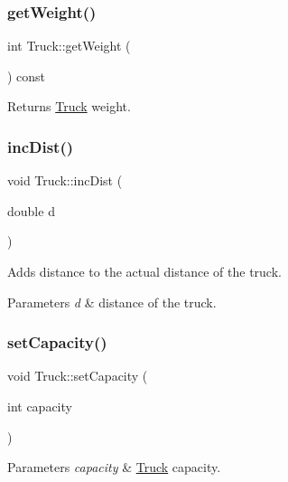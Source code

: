 \subsubsection{\texorpdfstring{get\+Weight()}{getWeight()}}
{\footnotesize\ttfamily int Truck\+::get\+Weight (\begin{DoxyParamCaption}{ }\end{DoxyParamCaption}) const}

\begin{DoxyReturn}{Returns}
\hyperlink{class_truck}{Truck} weight. 
\end{DoxyReturn}
\mbox{\label{class_truck_a42d199a149bb144de2da8163c8340c6c}} 
\subsubsection{\texorpdfstring{inc\+Dist()}{incDist()}}
{\footnotesize\ttfamily void Truck\+::inc\+Dist (\begin{DoxyParamCaption}\item[{double}]{d }\end{DoxyParamCaption})}



Adds distance to the actual distance of the truck. 


\begin{DoxyParams}{Parameters}
{\em d} & distance of the truck. \\
\hline
\end{DoxyParams}
\mbox{\label{class_truck_ac4491b8f4aac4f0fe4e45126fc29fb5f}} 
\subsubsection{\texorpdfstring{set\+Capacity()}{setCapacity()}}
{\footnotesize\ttfamily void Truck\+::set\+Capacity (\begin{DoxyParamCaption}\item[{int}]{capacity }\end{DoxyParamCaption})}


\begin{DoxyParams}{Parameters}
{\em capacity} & \hyperlink{class_truck}{Truck} capacity. \\
\hline
\end{DoxyParams}
\mbox{\label{class_truck_a97755be533acca6e29f00c4ee1695d29}} 

